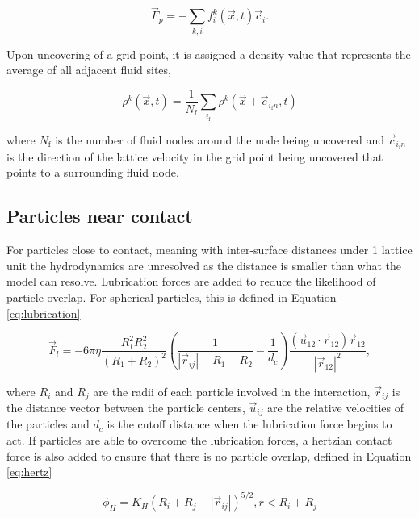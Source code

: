 \begin{equation}
    \vec{F}_p = -\sum_{k,i} f_i^k(\vec{x},t)\vec{c}_i .
\end{equation}

Upon uncovering of a grid point, it is assigned a density value that represents the average of all adjacent fluid sites,

\begin{equation}
    \rho^k(\vec{x},t) = \frac{1}{N_{\text{f}}} \sum_{i_{\text{f}}} \rho^k(\vec{x}+\vec{c}_{i_{\text{f}}n}, t)
    \label{eq:fill_particles}
\end{equation}

where $N_{\text{f}}$ is the number of fluid nodes around the node being uncovered and $\vec{c}_{i_{\text{f}}n}$ is the direction of the lattice velocity 
in the grid point being uncovered that points to a surrounding fluid node.

\subsection{Particles near contact}
\label{section:particles_near_contact}

For particles close to contact, meaning with inter-surface distances under 1 lattice unit the hydrodynamics are unresolved as the
distance is smaller than what the model can resolve. Lubrication forces are added to reduce the likelihood of particle overlap. For 
spherical particles, this is defined in Equation \eqref{eq:lubrication}

\begin{equation}
    \vec{F}_l = -6 \pi \eta \frac{R_1^2 R_2^2}{\left(R_1+R_2\right)^2}\left(\frac{1}{|\vec{r}_{ij}|-R_1-R_2}-\frac{1}{d_c}\right) \frac{\left(\vec{u}_{12}\cdot\vec{r}_{12}\right)\vec{r}_{12}}{|\vec{r}_{12}|^2} ,%
    \label{eq:lubrication}
\end{equation}

where $R_i$ and $R_j$ are the radii of each particle involved in the interaction, $\vec{r}_{ij}$ is the distance
vector between the particle centers, $\vec{u}_{ij}$ are the relative velocities of the particles and $d_c$ 
is the cutoff distance when the lubrication force begins to act. If particles are able to overcome the lubrication forces, 
a hertzian contact force is also added to ensure that there is no particle overlap, defined in Equation \eqref{eq:hertz}

\begin{equation}
    \phi_{H} = K_{H}(R_i + R_j - |\vec{r}_{ij}|)^{5/2}, r < R_i + R_j
    \label{eq:hertz}
\end{equation}

